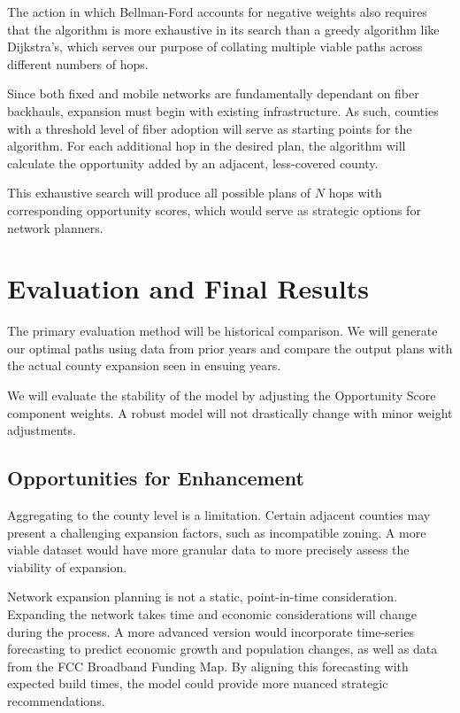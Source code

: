 \documentclass[11pt]{article}
\begin{document}
The action in which Bellman-Ford accounts for negative weights also requires that the algorithm is more exhaustive in its search than a greedy algorithm like Dijkstra's, which serves our purpose of collating multiple viable paths across different numbers of hops.

Since both fixed and mobile networks are fundamentally dependant on fiber backhauls, expansion must begin with existing infrastructure. As such, counties with a threshold level of fiber adoption will serve as starting points for the algorithm. For each additional hop in the desired plan, the algorithm will calculate the opportunity added by an adjacent, less-covered county.

This exhaustive search will produce all possible plans of $N$ hops with corresponding opportunity scores, which would serve as strategic options for network planners.

\section{Evaluation and Final Results}

The primary evaluation method will be historical comparison. We will generate our optimal paths using data from prior years and compare the output plans with the actual county expansion seen in ensuing years.

We will evaluate the stability of the model by adjusting the Opportunity Score component weights. A robust model will not drastically change with minor weight adjustments.

\subsection{Opportunities for Enhancement}

Aggregating to the county level is a limitation. Certain adjacent counties may present a challenging expansion factors, such as incompatible zoning. A more viable dataset would have more granular data to more precisely assess the viability of expansion.

Network expansion planning is not a static, point-in-time consideration. Expanding the network takes time and economic considerations will change during the process. A more advanced version would incorporate time-series forecasting to predict economic growth and population changes, as well as data from the FCC Broadband Funding Map. By aligning this forecasting with expected build times, the model could provide more nuanced strategic recommendations.


\printbibliography
\end{document}
